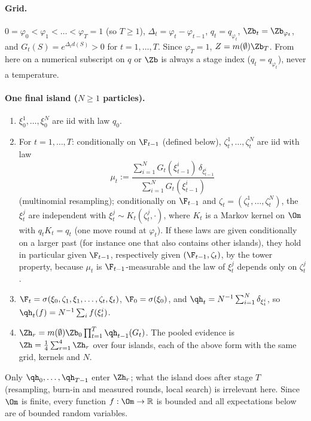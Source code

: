 \documentclass[11pt]{report}
\begin{document}
\paragraph{Grid.} $0=\varphi_0<\varphi_1<\dots<\varphi_T=1$ (so $T\ge1$), $\Delta_t=\varphi_t-\varphi_{t-1}$,
$q_t=q_{\varphi_t}$, $\Zb_t=\Zb_{\varphi_t}$, and $G_t(S)=e^{\Delta_t d(S)}>0$ for $t=1,\dots,T$. Since $\varphi_T=1$, $Z=m(\emptyset)\Zb_T$. From here on a numerical subscript on $q$ or $\Zb$ is always a stage index ($q_t=q_{\varphi_t}$), never a temperature.

\paragraph{One final island ($N\ge1$ particles).}
\begin{enumerate}[label=(\alph*)]
\item $\xi_0^1,\dots,\xi_0^N$ are iid with law $q_0$.
\item For $t=1,\dots,T$: conditionally on $\F_{t-1}$ (defined below), $\zeta_t^1,\dots,\zeta_t^N$ are iid with law
  \[
  \mu_t:=\frac{\sum_{i=1}^N G_t(\xi_{t-1}^i)\,\delta_{\xi_{t-1}^i}}{\sum_{i=1}^N G_t(\xi_{t-1}^i)}
  \]
  (multinomial resampling); conditionally on $\F_{t-1}$ and $\zeta_t=(\zeta_t^1,\dots,\zeta_t^N)$, the $\xi_t^j$ are independent
  with $\xi_t^j\sim K_t(\zeta_t^j,\cdot)$, where $K_t$ is a Markov kernel on $\Om$ with $q_tK_t=q_t$ (one move round at
  $\varphi_t$). If these laws are given conditionally on a larger past (for instance one that also contains other
  islands), they hold in particular given $\F_{t-1}$, respectively given $(\F_{t-1},\zeta_t)$, by the tower property,
  because $\mu_t$ is $\F_{t-1}$-measurable and the law of $\xi_t^j$ depends only on $\zeta_t^j$.
\item $\F_{t}=\sigma(\xi_0,\zeta_1,\xi_1,\dots,\zeta_t,\xi_t)$, $\F_0=\sigma(\xi_0)$, and
  $\qh_t=N^{-1}\sum_{i=1}^N\delta_{\xi_t^i}$, so $\qh_t(f)=N^{-1}\sum_i f(\xi_t^i)$.
\item $\Zh_r=m(\emptyset)\Zb_0\prod_{t=1}^T\qh_{t-1}(G_t)$. The pooled evidence is $\Zh=\tfrac14\sum_{r=1}^4\Zh_r$ over four
  islands, each of the above form with the same grid, kernels and $N$.
\end{enumerate}
Only $\qh_0,\dots,\qh_{T-1}$ enter $\Zh_r$; what the island does after stage $T$ (resampling, burn-in and measured rounds,
local search) is irrelevant here. Since $\Om$ is finite, every function $f:\Om\to\mathbb R$ is bounded and all
expectations below are of bounded random variables.
\end{document}
